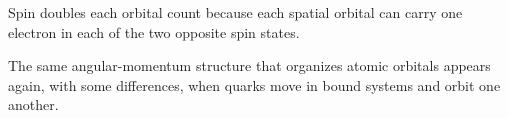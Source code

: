 Spin doubles each orbital count because each spatial orbital can carry one electron in each of the two opposite spin states.

\begin{classroomqa}
\end{classroomqa}

The same angular-momentum structure that organizes atomic orbitals appears again, with some differences, when quarks move in bound systems and orbit one another.
